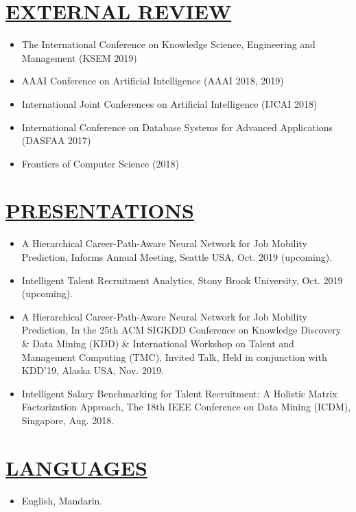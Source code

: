 \documentclass[11pt,letterpage]{res}
\begin{document}
\begin{resume}
\section{\underline{EXTERNAL REVIEW}}

\begin{itemize} %
	\item The International Conference on Knowledge Science, Engineering and Management (KSEM 2019)
	\item AAAI Conference on Artificial Intelligence (AAAI 2018, 2019)
    \item International Joint Conferences on Artificial Intelligence (IJCAI 2018)
    \item International Conference on Database Systems for Advanced Applications (DASFAA 2017)  
    \item Frontiers of Computer Science (2018)
\end{itemize}

\section{\underline{PRESENTATIONS}}
\begin{itemize} \itemsep -2pt
\item A Hierarchical Career-Path-Aware Neural Network for Job Mobility Prediction, Informs Annual Meeting, Seattle USA, Oct. 2019 (upcoming).
\item Intelligent Talent Recruitment Analytics, Stony Brook University, Oct. 2019 (upcoming).
\item A Hierarchical Career-Path-Aware Neural Network for Job Mobility Prediction, In the 25th ACM SIGKDD Conference on Knowledge Discovery \& Data Mining (KDD) \& International Workshop on Talent and Management Computing (TMC), Invited Talk, Held in conjunction with KDD'19, Alaska USA, Nov. 2019.
\item Intelligent Salary Benchmarking for Talent Recruitment: A Holistic Matrix Factorization Approach, The 18th IEEE Conference on Data Mining (ICDM), Singapore, Aug. 2018.
\end{itemize}


\section{\underline{LANGUAGES}}
\begin{itemize}
\item English, Mandarin.
\end{itemize}


\end{resume}
\end{document}
